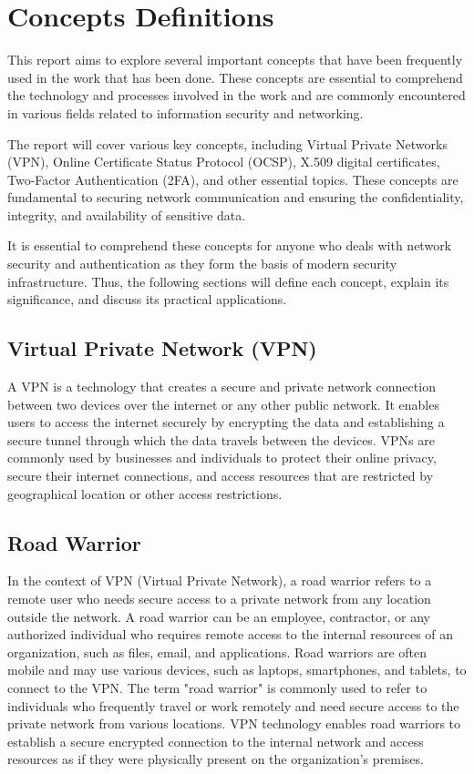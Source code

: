 \documentclass[12pt]{article}
\begin{document}
\section{Concepts Definitions}

This report aims to explore several important concepts that have been frequently used in the work that has been done. These concepts are essential to comprehend the technology and processes involved in the work and are commonly encountered in various fields related to information security and networking.

The report will cover various key concepts, including Virtual Private Networks (VPN), Online Certificate Status Protocol (OCSP), X.509 digital certificates, Two-Factor Authentication (2FA), and other essential topics. These concepts are fundamental to securing network communication and ensuring the confidentiality, integrity, and availability of sensitive data.

It is essential to comprehend these concepts for anyone who deals with network security and authentication as they form the basis of modern security infrastructure. Thus, the following sections will define each concept, explain its significance, and discuss its practical applications.

\subsection{Virtual Private Network (VPN)}
A VPN is a technology that creates a secure and private network connection between two devices over the internet or any other public network. It enables users to access the internet securely by encrypting the data and establishing a secure tunnel through which the data travels between the devices. VPNs are commonly used by businesses and individuals to protect their online privacy, secure their internet connections, and access resources that are restricted by geographical location or other access restrictions.

\subsection{Road Warrior}
In the context of VPN (Virtual Private Network), a road warrior refers to a remote user who needs secure access to a private network from any location outside the network. A road warrior can be an employee, contractor, or any authorized individual who requires remote access to the internal resources of an organization, such as files, email, and applications. Road warriors are often mobile and may use various devices, such as laptops, smartphones, and tablets, to connect to the VPN. The term "road warrior" is commonly used to refer to individuals who frequently travel or work remotely and need secure access to the private network from various locations. VPN technology enables road warriors to establish a secure encrypted connection to the internal network and access resources as if they were physically present on the organization's premises.
\end{document}
